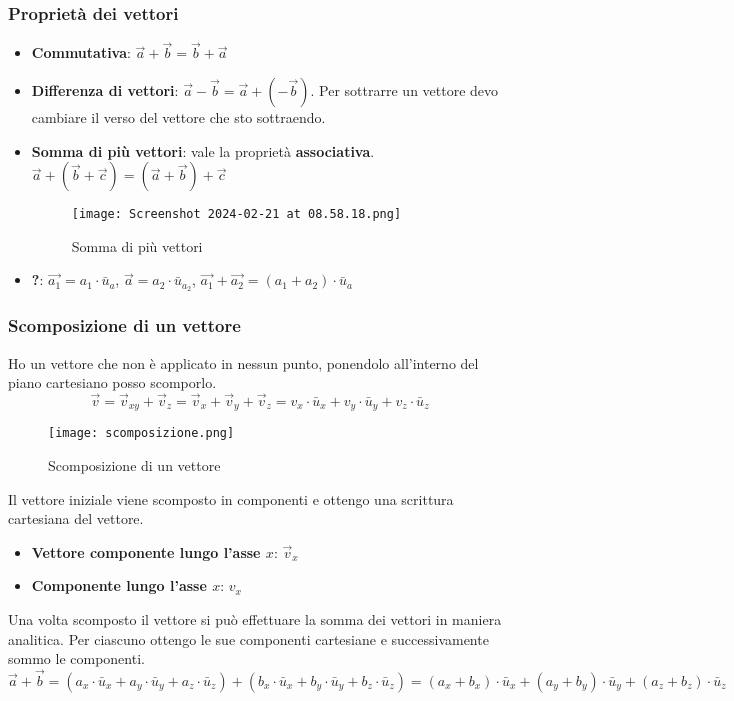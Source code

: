 \documentclass[../../main.tex]{subfiles}
\begin{document}
\subsubsection{Proprietà dei vettori}
\begin{itemize}
    \item \textbf{Commutativa}: $\vec{a} + \vec{b} = \vec{b} + \vec{a}$
    \item \textbf{Differenza di vettori}: $\vec{a} - \vec{b} = \vec{a} + (-\vec{b})$. Per sottrarre un vettore devo cambiare il verso del vettore che sto sottraendo.
    \item \textbf{Somma di più vettori}: vale la proprietà \textbf{associativa}. $\vec{a} + (\vec{b} + \vec{c}) = (\vec{a} + \vec{b}) + \vec{c}$ \begin{figure}
        \centering
        \texttt{[image: Screenshot 2024-02-21 at 08.58.18.png]}
        \caption{Somma di più vettori}
    \end{figure}
    \item \textbf{?}: $\vec{a_1} = a_1 \cdot \bar{u}_{a}$, $\vec{a} = a_2 \cdot \bar{u}_{a_2}$, $\vec{a_1} + \vec{a_2} = (a_1 + a_2) \cdot \bar{u}_{a}$
\end{itemize}
\subsubsection{Scomposizione di un vettore}
Ho un vettore che non è applicato in nessun punto, ponendolo all'interno del piano cartesiano posso scomporlo.
\[
    \vec{v} = \vec{v}_{xy} + \vec{v}_{z} = \vec{v}_{x} + \vec{v}_{y} + \vec{v}_{z} = v_x \cdot \bar{u}_x + v_y \cdot \bar{u}_y + v_z \cdot \bar{u}_z
\]
\begin{figure}[h!]
    \centering
    \texttt{[image: scomposizione.png]}
    \caption{Scomposizione di un vettore}
\end{figure}

Il vettore iniziale viene scomposto in componenti e ottengo una scrittura cartesiana del vettore.
\begin{itemize}
    \item \textbf{Vettore componente lungo l'asse $x$}: $\vec{v}_x$
    \item \textbf{Componente lungo l'asse $x$}: $v_x$
\end{itemize}
Una volta scomposto il vettore si può effettuare la somma dei vettori in maniera analitica. Per ciascuno ottengo le sue componenti cartesiane e successivamente sommo le componenti.
\[
    \vec{a} + \vec{b} = (a_x \cdot \bar{u}_x + a_y \cdot \bar{u}_y + a_z \cdot \bar{u}_z) + (b_x \cdot \bar{u}_x + b_y \cdot \bar{u}_y + b_z \cdot \bar{u}_z) = (a_x + b_x) \cdot \bar{u}_x + (a_y + b_y) \cdot \bar{u}_y + (a_z + b_z) \cdot \bar{u}_z
\]
\end{document}
